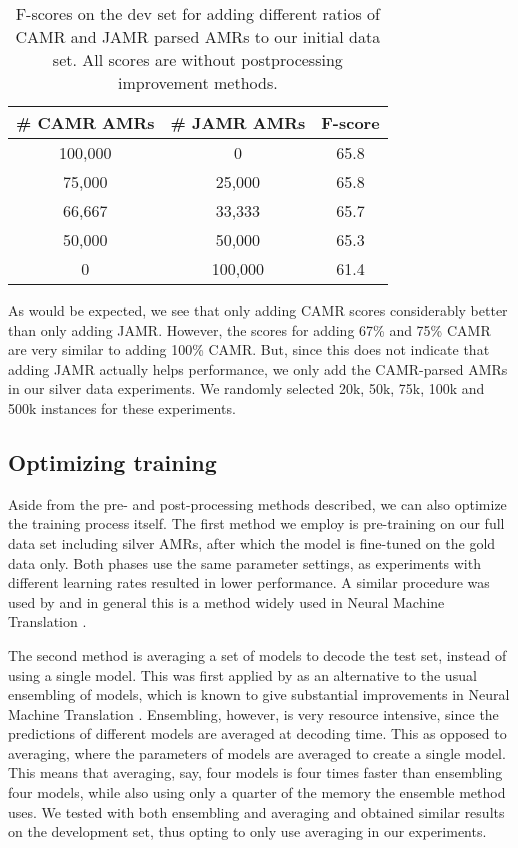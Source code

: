 \documentclass[a4paper,10pt,twoside]{article}
\begin{document}
\begin{table}[htb]
\centering
\caption{\label{tab:camrjamr}F-scores on the dev set for adding different ratios of CAMR and JAMR parsed AMRs to our initial data set. All scores are without postprocessing improvement methods.}
\begin{tabular}{ccc}
\toprule
\textbf{\# CAMR AMRs} & \textbf{\# JAMR AMRs} & \textbf{F-score} \\ \midrule
100,000               & 0                     &   65.8           \\
75,000                & 25,000                &   65.8           \\
66,667                & 33,333                &   65.7           \\
50,000                & 50,000                &   65.3           \\
0                     & 100,000               &   61.4    		 \\ \bottomrule          
\end{tabular}
\end{table}

As would be expected, we see that only adding CAMR scores considerably better than only adding JAMR. However, the scores for adding 67\% and 75\% CAMR are very similar to adding 100\% CAMR. But, since this does not indicate that adding JAMR actually helps performance, we only add the CAMR-parsed AMRs in our silver data experiments. We randomly selected 20k, 50k, 75k, 100k and 500k instances for these experiments.

\subsection{Optimizing training}

Aside from the pre- and post-processing methods described, we can also optimize the training process itself. The first method we employ is pre-training on our full data set including silver AMRs, after which the model is fine-tuned on the gold data only. Both phases use the same parameter settings, as experiments with different learning rates resulted in lower performance. A similar procedure was used by  and in general this is a method widely used in Neural Machine Translation \cite{denkowski:17}. 

The second method is averaging a set of models to decode the test set, instead of using a single model. This was first applied by  as an alternative to the usual ensembling of models, which is known to give substantial improvements in Neural Machine Translation \cite{sutskever:14}. Ensembling, however, is very resource intensive, since the predictions of different models are averaged at decoding time. This as opposed to averaging, where the parameters of models are averaged to create a single model. This means that averaging, say, four models is four times faster than ensembling four models, while also using only a quarter of the memory the ensemble method uses. We tested with both ensembling and averaging and obtained similar results on the development set, thus opting to only use averaging in our experiments.
\end{document}
